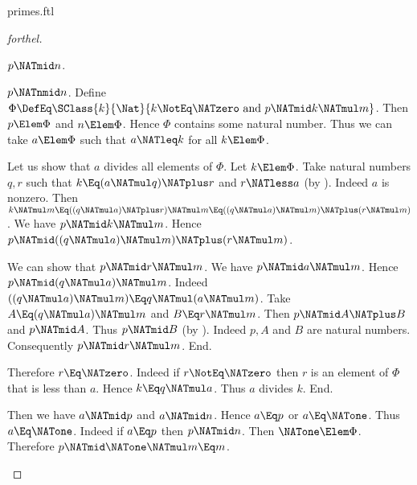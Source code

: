 \documentclass{stex}
\begin{document}
\begin{smodule}{primes.ftl}
\begin{proof}[forthel]
  \begin{case}{$p \NATmid n$.} \end{case}

  \begin{case}{$p \NATnmid n$.}
    Define $\Phi \DefEq \SClass{k}{\Nat}{k \NotEq \NATzero\text{ and }p \NATmid k \NATmul m}$.
    Then $p \Elem \Phi$ and $n \Elem \Phi$.
    Hence $\Phi$ contains some natural number.
    Thus we can take $a \Elem \Phi$ such that $a \NATleq k$ for all $k \Elem \Phi$.

    Let us show that $a$ divides all elements of $\Phi$.
      Let $k \Elem \Phi$.
      Take natural numbers $q, r$ such that $k \Eq (a \NATmul q) \NATplus r$ and $r \NATless a$ (by ).
      Indeed $a$ is nonzero.
      Then $k \NATmul m
        \Eq ((q \NATmul a) \NATplus r) \NATmul m
        \Eq ((q \NATmul a) \NATmul m) \NATplus (r \NATmul m)$.
      We have $p \NATmid k \NATmul m$.
      Hence $p \NATmid ((q \NATmul a) \NATmul m) \NATplus (r \NATmul m)$.

      We can show that $p \NATmid r \NATmul m$.
        We have $p \NATmid a \NATmul m$.
        Hence $p \NATmid (q \NATmul a) \NATmul m$.
        Indeed $((q \NATmul a) \NATmul m) \Eq q \NATmul (a \NATmul m)$. %
        Take $A \Eq (q \NATmul a) \NATmul m$ and $B \Eq r \NATmul m$. %
        Then $p \NATmid A \NATplus B$ and $p \NATmid A$.
        Thus $p \NATmid B$ (by ).
        Indeed $p, A$ and $B$ are natural numbers.
        Consequently $p \NATmid r \NATmul m$.
      End.

      Therefore $r \Eq \NATzero$.
      Indeed if $r \NotEq \NATzero$ then $r$ is an element of $\Phi$ that is less than $a$.
      Hence $k \Eq q \NATmul a$.
      Thus $a$ divides $k$.
    End.

    Then we have $a \NATmid p$ and $a \NATmid n$.
    Hence $a \Eq p$ or $a \Eq \NATone$.
    Thus $a \Eq \NATone$.
    Indeed if $a \Eq p$ then $p \NATmid n$.
    Then $\NATone \Elem \Phi$.
    Therefore $p \NATmid \NATone \NATmul m \Eq m$.
  \end{case}
\end{proof}
\end{smodule}
\end{document}
